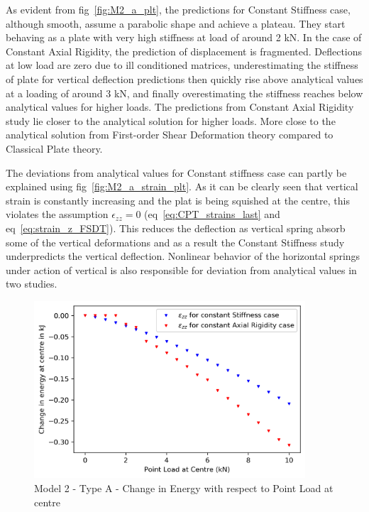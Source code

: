 As evident from fig~\ref{fig:M2_a_plt}, the predictions for Constant Stiffness case, although smooth, assume a parabolic shape and achieve a plateau. They start behaving as a plate with very high stiffness at load of around 2 kN. In the case of Constant Axial Rigidity, the prediction of displacement is fragmented. Deflections at low load are zero due to ill conditioned matrices, underestimating the stiffness of plate for vertical deflection predictions then quickly rise above analytical values at a loading of around 3 kN, and finally overestimating the stiffness reaches below analytical values for higher loads. The predictions from Constant Axial Rigidity study lie closer to the analytical solution for higher loads. More close to the analytical solution from First-order Shear Deformation theory compared to Classical Plate theory.

The deviations from analytical values for Constant stiffness case can partly be explained using fig~\ref{fig:M2_a_strain_plt}. As it can be clearly seen that vertical strain is constantly increasing and the plat is being squished at the centre, this violates the assumption $\epsilon_{zz} = 0$ (eq~\ref{eq:CPT_strains_last} and eq~\ref{eq:strain_z_FSDT}). This reduces the deflection as vertical spring absorb some of the vertical deformations and as a result the Constant Stiffness study underpredicts the vertical deflection. Nonlinear behavior of the horizontal springs under action of vertical is also responsible for deviation from analytical values in two studies.

\begin{figure}[!htbp]
    \centering
    \includegraphics[width = 0.9\textwidth]{Figures/M2_a_energy.png}
    \caption{Model 2 - Type A - Change in Energy with respect to Point Load at centre}
    \label{fig:M2_a_energy}
\end{figure}

